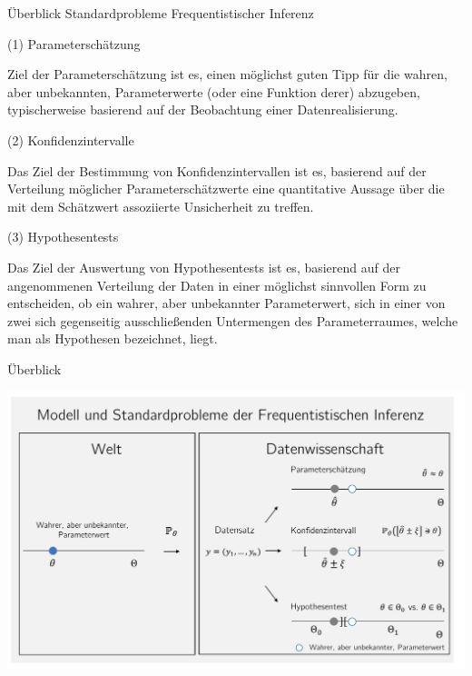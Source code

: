 \documentclass[
  8pt,
  ignorenonframetext,
]{beamer}
\begin{document}
\begin{frame}{Überblick}
\protect\hypertarget{uxfcberblick-3}{}
Standardprobleme Frequentistischer Inferenz \small

\noindent (1) Parameterschätzung

Ziel der Parameterschätzung ist es, einen möglichst guten Tipp für die
wahren, aber unbekannten, Parameterwerte (oder eine Funktion derer)
abzugeben, typischerweise basierend auf der Beobachtung einer
Datenrealisierung. \vspace{2mm}

\noindent (2) Konfidenzintervalle

Das Ziel der Bestimmung von Konfidenzintervallen ist es, basierend auf
der Verteilung möglicher Parameterschätzwerte eine quantitative Aussage
über die mit dem Schätzwert assoziierte Unsicherheit zu treffen.
\vspace{2mm}

\noindent (3) Hypothesentests

Das Ziel der Auswertung von Hypothesentests ist es, basierend auf der
angenommenen Verteilung der Daten in einer möglichst sinnvollen Form zu
entscheiden, ob ein wahrer, aber unbekannter Parameterwert, sich in
einer von zwei sich gegenseitig ausschließenden Untermengen des
Parameterraumes, welche man als Hypothesen bezeichnet, liegt.
\end{frame}

\begin{frame}{Überblick}
\protect\hypertarget{uxfcberblick-4}{}
\begin{center}\includegraphics[width=1\linewidth]{5_Abbildungen/alm_5_frequentistische_inferenz} \end{center}
\end{frame}
\end{document}

